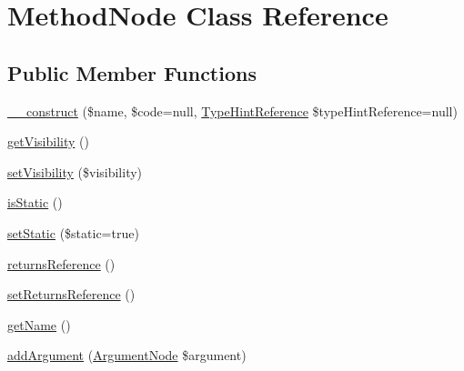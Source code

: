 \hypertarget{class_prophecy_1_1_doubler_1_1_generator_1_1_node_1_1_method_node}{}\section{Method\+Node Class Reference}
\label{class_prophecy_1_1_doubler_1_1_generator_1_1_node_1_1_method_node}
\subsection*{Public Member Functions}
\begin{DoxyCompactItemize}
\item 
\mbox{\hyperlink{class_prophecy_1_1_doubler_1_1_generator_1_1_node_1_1_method_node_af8248dffc35d1c0b50a9a116df956c47}{\+\_\+\+\_\+construct}} (\$name, \$code=null, \mbox{\hyperlink{class_prophecy_1_1_doubler_1_1_generator_1_1_type_hint_reference}{Type\+Hint\+Reference}} \$type\+Hint\+Reference=null)
\item 
\mbox{\hyperlink{class_prophecy_1_1_doubler_1_1_generator_1_1_node_1_1_method_node_a292b98b1e11ce740774e4d99a8276904}{get\+Visibility}} ()
\item 
\mbox{\hyperlink{class_prophecy_1_1_doubler_1_1_generator_1_1_node_1_1_method_node_a7b53fba205e9a70a18da4c92ef93c578}{set\+Visibility}} (\$visibility)
\item 
\mbox{\hyperlink{class_prophecy_1_1_doubler_1_1_generator_1_1_node_1_1_method_node_a9b2dd808ffcd764782fb11b3ea583a8d}{is\+Static}} ()
\item 
\mbox{\hyperlink{class_prophecy_1_1_doubler_1_1_generator_1_1_node_1_1_method_node_acb0f77d318530f125c30a2a50c59f601}{set\+Static}} (\$static=true)
\item 
\mbox{\hyperlink{class_prophecy_1_1_doubler_1_1_generator_1_1_node_1_1_method_node_a0d750cfacc4880950d7ca35d4e18d5ac}{returns\+Reference}} ()
\item 
\mbox{\hyperlink{class_prophecy_1_1_doubler_1_1_generator_1_1_node_1_1_method_node_a10b62418ef39e9c343574c33dbe22035}{set\+Returns\+Reference}} ()
\item 
\mbox{\hyperlink{class_prophecy_1_1_doubler_1_1_generator_1_1_node_1_1_method_node_a3d0963e68bb313b163a73f2803c64600}{get\+Name}} ()
\item 
\mbox{\hyperlink{class_prophecy_1_1_doubler_1_1_generator_1_1_node_1_1_method_node_a6b084b8051e58043d86c23e7efe166af}{add\+Argument}} (\mbox{\hyperlink{class_prophecy_1_1_doubler_1_1_generator_1_1_node_1_1_argument_node}{Argument\+Node}} \$argument)

\end{DoxyCompactItemize}
